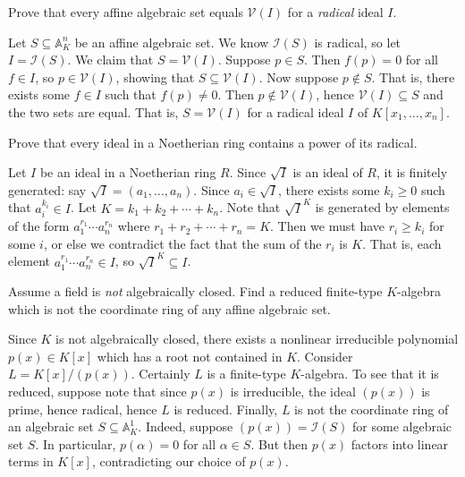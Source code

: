 \documentclass[../../master.tex]{subfiles}
\begin{document}
\begin{problem}
    Prove that every affine algebraic set equals $\mathscr{V}(I)$ for a \textit{radical} ideal $I$.
\end{problem}

\begin{solution}
    Let $S \subseteq \mathbb{A}^{n}_K$ be an affine algebraic set.
    We know $\mathscr{I}(S)$ is radical, so let $I = \mathscr{I}(S)$.
    We claim that $S = \mathscr{V}(I)$.
    Suppose $p \in S$.
    Then $f(p) = 0$ for all $f \in I$, so $p \in \mathscr{V}(I)$, showing that $S \subseteq \mathscr{V}(I)$.
    Now suppose $p \notin S$.
    That is, there exists some $f \in I$ such that $f(p) \neq 0$.
    Then $p \notin \mathscr{V}(I)$, hence $\mathscr{V}(I) \subseteq S$ and the two sets are equal.
    That is, $S = \mathscr{V}(I)$ for a radical ideal $I$ of $K[x_1, \ldots, x_n]$.
\end{solution}

\begin{problem}
    Prove that every ideal in a Noetherian ring contains a power of its radical.
\end{problem}

\begin{solution}
    Let $I$ be an ideal in a Noetherian ring $R$.
    Since $\sqrt{I}$ is an ideal of $R$, it is finitely generated: say $\sqrt{I} = (a_1, \ldots, a_n)$.
    Since $a_i \in \sqrt{I}$, there exists some $k_i \geq 0$ such that $a_i^{k_i} \in I$.
    Let $K = k_1 + k_2 + \cdots + k_n$.
    Note that $\sqrt{I}^{K}$ is generated by elements of the form $a_1^{r_1} \cdots a_n^{r_n}$ where $r_1 + r_2 + \cdots + r_n = K$.
    Then we must have $r_i \geq k_i$ for some $i$, or else we contradict the fact that the sum of the $r_i$ is $K$.
    That is, each element $a_1^{r_1} \cdots a_n^{r_n} \in I$, so $\sqrt{I}^{K} \subseteq I$.
\end{solution}

\begin{problem}
    Assume a field is \textit{not} algebraically closed.
    Find a reduced finite-type $K$-algebra which is not the coordinate ring of any affine algebraic set.
\end{problem}

\begin{solution}
    Since $K$ is not algebraically closed, there exists a nonlinear irreducible polynomial $p(x) \in K[x]$ which has a root not contained in $K$.
    Consider $L = K[x] / (p(x))$.
    Certainly $L$ is a finite-type $K$-algebra.
    To see that it is reduced, suppose note that since $p(x)$ is irreducible, the ideal $(p(x))$ is prime, hence radical, hence $L$ is reduced.
    Finally, $L$ is not the coordinate ring of an algebraic set $S \subseteq \mathbb{A}^{1}_K$.
    Indeed, suppose $(p(x)) = \mathscr{I}(S)$ for some algebraic set $S$.
    In particular, $p(\alpha) = 0$ for all $\alpha \in S$.
    But then $p(x)$ factors into linear terms in $K[x]$, contradicting our choice of $p(x)$.
\end{solution}
\end{document}
